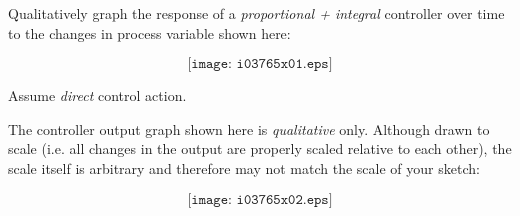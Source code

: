 

Qualitatively graph the response of a {\it proportional + integral} controller over time to the changes in process variable shown here:

$$\texttt{[image: i03765x01.eps]}$$

Assume {\it direct} control action.







The controller output graph shown here is {\it qualitative} only.  Although drawn to scale (i.e. all changes in the output are properly scaled relative to each other), the scale itself is arbitrary and therefore may not match the scale of your sketch:

$$\texttt{[image: i03765x02.eps]}$$










